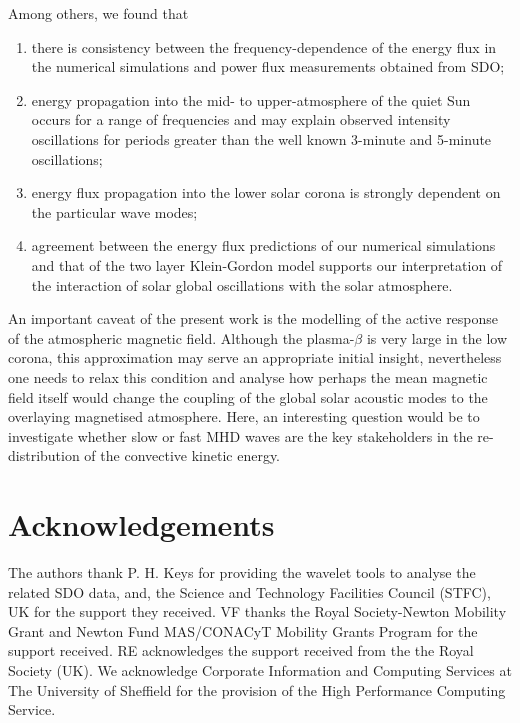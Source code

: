 \documentclass[preprint,authoryear,12pt]{elsarticle}
\begin{document}
Among others, we found that
   \begin{enumerate}
      \item there is consistency between the frequency-dependence of the energy flux in the numerical simulations and power 
      flux measurements obtained from SDO;
      \item energy propagation into the mid- to upper-atmosphere of the quiet Sun occurs for a range of frequencies and may explain observed intensity oscillations for periods greater than the well known 3-minute and 5-minute oscillations; 
      \item energy flux propagation into the lower solar corona is strongly dependent on the particular wave modes;
 \item agreement between the energy flux predictions of our numerical simulations and that of the two layer 
      Klein-Gordon model supports our interpretation of the interaction of solar global oscillations with the solar atmosphere.
   \end{enumerate}

An important caveat of the present work is the modelling of the active response of the atmospheric magnetic field. Although the plasma-$\beta$ is very large in the low corona, this approximation may serve an appropriate initial insight, nevertheless one needs to relax this condition and analyse how perhaps the mean magnetic field itself would change the coupling of the global solar acoustic modes to the overlaying magnetised atmosphere. Here, an interesting question would be to investigate whether slow or fast MHD waves are the key stakeholders in the re-distribution of the convective kinetic energy.  

\section{Acknowledgements}
 The authors thank P. H. Keys for providing the wavelet tools to analyse the related SDO data, and, the Science and Technology Facilities Council (STFC), UK for the support they received. 
VF thanks the Royal Society-Newton Mobility Grant and Newton Fund MAS/CONACyT Mobility
Grants Program for the support received. RE acknowledges the support received from the the Royal Society (UK). 
We acknowledge Corporate Information and Computing Services at The University of Sheffield for the provision of the High Performance Computing Service.



%

%
%


\end{document}
